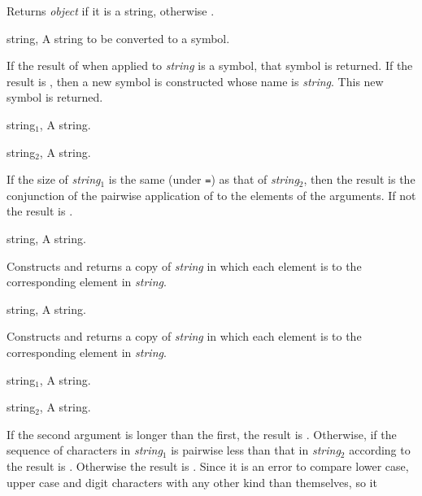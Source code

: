 \begin{optDefinition}
\begin{arguments}
\end{arguments}
%
\result
Returns {\em object\/} if it is a string, otherwise \nil{}.
%
\begin{specargs}
    \item[string, \classref{string}] A string to be converted to a symbol.
\end{specargs}
%
\result
If the result of  when applied to {\em string\/}
is a symbol, that symbol is returned.  If the result is \nil{}, then
a new symbol is constructed whose name is {\em string}.  This new
symbol is returned.
%
%
\begin{specargs}
    \item[string$_1$, \classref{string}] A string.
    \item[string$_2$, \classref{string}] A string.
\end{specargs}
%
\result
If the size of {\em string$_1$} is the same (under {\tt =}) as that of
{\em string$_2$}, then the result is the conjunction of the pairwise
application of  to the elements of the arguments.  If not
the result is \nil{}.
%
%
\begin{specargs}
    \item[string, \classref{string}] A string.
\end{specargs}
%
\result
Constructs and returns a copy of {\em string\/} in which each element
is  to the corresponding element in {\em string}.
%
%
\begin{specargs}
    \item[string, \classref{string}] A string.
\end{specargs}
%
\result
Constructs and returns a copy of {\em string\/} in which each element
is  to the corresponding element in {\em string}.
%
%
\begin{specargs}
    \item[string$_1$, \classref{string}] A string.
    \item[string$_2$, \classref{string}] A string.
\end{specargs}
%
\result%
If the second argument is longer than the first, the result is \nil{}.
Otherwise, if the sequence of characters in {\em string$_1$} is pairwise less
than that in {\em string$_2$} according to  the result is
\true.  Otherwise the result is \nil{}.  Since it is an error to compare lower
case, upper case and digit characters with any other kind than themselves, so it

\end{optDefinition}
